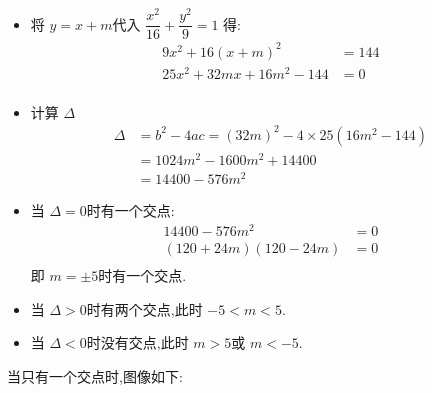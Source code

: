 \begin{questions}
	\begin{solution}
		\begin{itemize}
			\item 将 \( y = x + m \)代入 \( \dfrac{x^2}{16} + \dfrac{y^2}{9} = 1  \) 得:
			      \begin{align*}
				      9x^2 + 16(x+m)^2           & = 144 \\
				      25x^2 + 32mx + 16m^2 - 144 & = 0   \\
			      \end{align*}
			\item 计算 \( \Delta \)
			      \begin{align*}
				      \Delta & = b^2 - 4ac = (32m)^2 - 4\times25(16m^2 - 144) \\
				             & = 1024m^2 - 1600m^2 + 14400                    \\
				             & = 14400 - 576m^2
			      \end{align*}
			\item 当 \( \Delta = 0 \)时有一个交点:
			      \begin{align*}
				      14400 - 576m^2         & = 0 \\
				      (120 + 24m)(120 - 24m) & = 0 \\
			      \end{align*}
			      即 \( m = \pm5 \)时有一个交点.
			\item 当 	\(  \Delta > 0 \)时有两个交点,此时 \( -5 < m < 5 \).
			\item 当 \( \Delta < 0 \)时没有交点,此时 \( m > 5 \)或 \( m < -5 \).

		\end{itemize}
		当只有一个交点时,图像如下:
		\begin{center}
		\end{center}
	\end{solution}


\end{questions}
